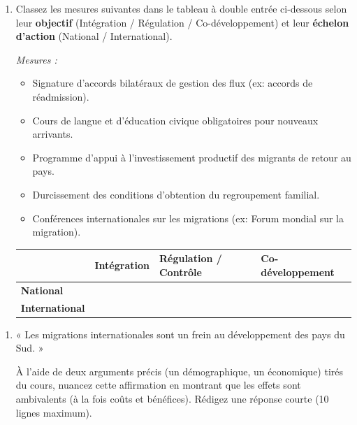 \documentclass[11pt]{article}
\begin{document}
\begin{exercice}
\begin{enumerate}
    \item Classez les mesures suivantes dans le tableau à double entrée ci-dessous selon leur \textbf{objectif} (Intégration / Régulation / Co-développement) et leur \textbf{échelon d'action} (National / International).
    
    \textit{Mesures :}
    \begin{itemize}
        \item Signature d'accords bilatéraux de gestion des flux (ex: accords de réadmission).
        \item Cours de langue et d'éducation civique obligatoires pour nouveaux arrivants.
        \item Programme d'appui à l'investissement productif des migrants de retour au pays.
        \item Durcissement des conditions d'obtention du regroupement familial.
        \item Conférences internationales sur les migrations (ex: Forum mondial sur la migration).
    \end{itemize}
    
    \begin{tabular}{|p{2.5cm}|p{3.5cm}|p{3.5cm}|p{3.5cm}|}
    \hline
    & \textbf{Intégration} & \textbf{Régulation / Contrôle} & \textbf{Co-développement} \\
    \hline
    \textbf{National} & & & \\
    \hline
    \textbf{International} & & & \\
    \hline
    \end{tabular}
\end{enumerate}
\end{exercice}

\begin{exercice}
\begin{enumerate}
    \item « Les migrations internationales sont un frein au développement des pays du Sud. » 
    
    À l'aide de deux arguments précis (un démographique, un économique) tirés du cours, nuancez cette affirmation en montrant que les effets sont ambivalents (à la fois coûts et bénéfices). Rédigez une réponse courte (10 lignes maximum).
\end{enumerate}
\end{exercice}
\end{document}
